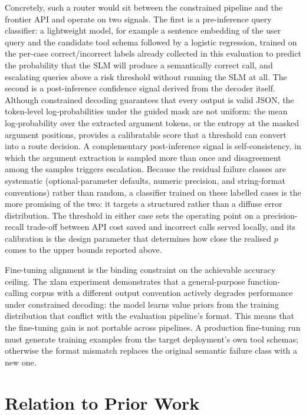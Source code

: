 Concretely, such a router would sit between the constrained pipeline and the
frontier API and operate on two signals. The first is a pre-inference query
classifier: a lightweight model, for example a sentence embedding of the user
query and the candidate tool schema followed by a logistic regression, trained
on the per-case correct/incorrect labels already collected in this evaluation
to predict the probability that the SLM will produce a semantically correct
call, and escalating queries above a risk threshold without running the SLM at
all. The second is a post-inference confidence signal derived from the decoder
itself. Although constrained decoding guarantees that every output is valid
JSON, the token-level log-probabilities under the guided mask are not uniform:
the mean log-probability over the extracted argument tokens, or the entropy at
the masked argument positions, provides a calibratable score that a threshold
can convert into a route decision. A complementary post-inference signal is
self-consistency, in which the argument extraction is sampled more than once and
disagreement among the samples triggers escalation. Because the residual failure
classes are systematic (optional-parameter defaults, numeric precision, and
string-format conventions) rather than random, a classifier trained on these
labelled cases is the more promising of the two: it targets a structured rather
than a diffuse error distribution. The threshold in either case sets the
operating point on a precision-recall trade-off between API cost saved and
incorrect calls served locally, and its calibration is the design parameter that
determines how close the realised $p$ comes to the upper bounds reported above.

Fine-tuning alignment is the binding constraint on the achievable accuracy
ceiling. The xlam experiment demonstrates that a general-purpose
function-calling corpus with a different output convention actively degrades
performance under constrained decoding: the model learns value priors from
the training distribution that conflict with the evaluation pipeline's
format. This means that the fine-tuning gain is not portable across
pipelines. A production fine-tuning run must generate training examples
from the target deployment's own tool schemas; otherwise the format
mismatch replaces the original semantic failure class with a new one.

\section{Relation to Prior Work}

